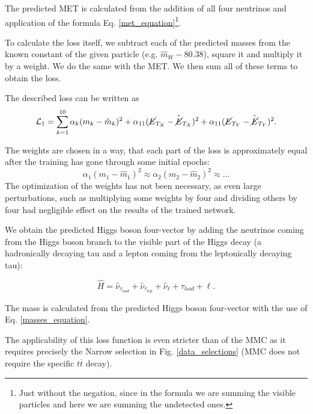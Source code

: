 \documentclass{ctuthesis}
\begin{document}
The predicted MET is calculated from the addition of all four neutrinos and application of the formula Eq. \ref{met_equation}\footnote{Just without the negation, since in the formula we are summing the visible particles and here we are summing the undetected ones.}.

To calculate the loss itself, we subtract each of the predicted masses from the known constant of the given particle (e.g. $\hat{m}_W-80.38$), square it and multiply it by a weight. We do the same with the MET. We then sum all of these terms to obtain the loss.

The described loss can be written as 
\begin{equation}
    \mathcal{L}_{1} = \sum_{k=1}^{10} \alpha_k(m_{k}-\hat{m}_{k})^2 + \alpha_{11}(\cancel{E}_{T_X}-\hat{\cancel{E}}_{T_X})^2 + \alpha_{11}(\cancel{E}_{T_Y}-\hat{\cancel{E}}_{T_Y})^2.
\label{mmc_inspired_loss}
\end{equation}

The weights are chosen in a way, that each part of the loss is approximately equal after the training has gone through some initial epochs:
\begin{equation}
    \alpha_1(m_{1}-\hat{m}_{1})^2 \approx \alpha_2(m_{2}-\hat{m}_{2})^2 \approx \dots
\end{equation}
The optimization of the weights has not been necessary, as even large perturbations, such as multiplying some weights by four and dividing others by four had negligible effect on the results of the trained network.

We obtain the predicted Higgs boson four-vector by adding the neutrinos coming from the Higgs boson branch to the visible part of the Higgs decay \linebreak(a hadronically decaying tau and a lepton coming from the leptonically decaying tau):

\begin{equation}
    \hat{H} = \hat{\nu}_{\tau_{had}} + \hat{\nu}_{\tau_{lep}} + \hat{\nu}_\ell + \tau_{had} + \ell.
\end{equation}

The mass is calculated from the predicted Higgs boson four-vector with the use of Eq. \ref{masses_equation}.

The applicability of this loss function is even stricter than of the MMC as it requires precisely the Narrow selection in Fig. \ref{data_selections} (MMC does not require the specific $t\overline{t}$ decay).

\end{document}
